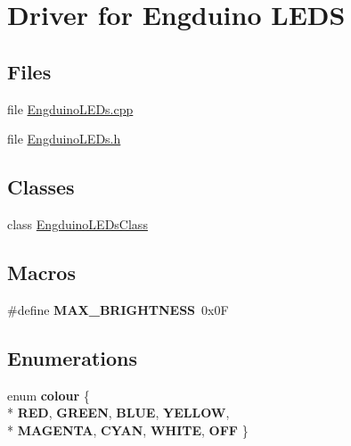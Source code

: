 \hypertarget{group___engduino_l_e_ds}{}\section{Driver for Engduino L\+E\+D\+S}
\label{group___engduino_l_e_ds}
\subsection*{Files}
\begin{DoxyCompactItemize}
\item 
file \hyperlink{_engduino_l_e_ds_8cpp}{Engduino\+L\+E\+Ds.\+cpp}
\item 
file \hyperlink{_engduino_l_e_ds_8h}{Engduino\+L\+E\+Ds.\+h}
\end{DoxyCompactItemize}
\subsection*{Classes}
\begin{DoxyCompactItemize}
\item 
class \hyperlink{class_engduino_l_e_ds_class}{Engduino\+L\+E\+Ds\+Class}
\end{DoxyCompactItemize}
\subsection*{Macros}
\begin{DoxyCompactItemize}
\item 
\hypertarget{group___engduino_l_e_ds_ga2134a5a06f0865c945543a1f07eba387}{}\#define {\bfseries M\+A\+X\+\_\+\+B\+R\+I\+G\+H\+T\+N\+E\+S\+S}~0x0\+F\label{group___engduino_l_e_ds_ga2134a5a06f0865c945543a1f07eba387}

\end{DoxyCompactItemize}
\subsection*{Enumerations}
\begin{DoxyCompactItemize}
\item 
\hypertarget{group___engduino_l_e_ds_gaa68e842dd7ce4ebaf9792928e4a990f0}{}enum {\bfseries colour} \{ \\*
{\bfseries R\+E\+D}, 
{\bfseries G\+R\+E\+E\+N}, 
{\bfseries B\+L\+U\+E}, 
{\bfseries Y\+E\+L\+L\+O\+W}, 
\\*
{\bfseries M\+A\+G\+E\+N\+T\+A}, 
{\bfseries C\+Y\+A\+N}, 
{\bfseries W\+H\+I\+T\+E}, 
{\bfseries O\+F\+F}
 \}\label{group___engduino_l_e_ds_gaa68e842dd7ce4ebaf9792928e4a990f0}

\end{DoxyCompactItemize}
